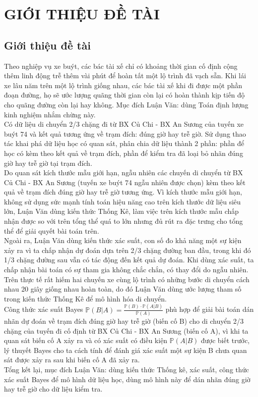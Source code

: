 \documentclass[a4paper, 13pt]{report}
\begin{document}
\chapter{GIỚI THIỆU ĐỀ TÀI} %
\section{Giới thiệu đề tài}
Theo nghiệp vụ xe buýt, các bác tài xế chỉ có khoảng thời gian cố định cộng thêm linh động trễ thêm vài phút để hoàn tất một lộ trình đã vạch sẵn. Khi lái xe lâu năm trên một lộ trình giống nhau, các bác tài xế khi đi được một phần đoạn đường, họ sẽ ước lượng quãng thời gian còn lại có hoàn thành kịp tiến độ cho quãng đường còn lại hay không. Mục đích Luận Văn: dùng Toán định lượng kinh nghiệm nhắm chừng này.\\
Có dữ liệu di chuyển 2/3 chặng đi từ BX Củ Chi - BX An Sương của tuyến xe buýt 74 và kết quả tương ứng về trạm đích: đúng giờ hay trễ giờ. Sử dụng thao tác khai phá dữ liệu học có quan sát, phân chia dữ liệu thành 2 phần: phần để học có kèm theo kết quả về trạm đích, phần để kiểm tra đã loại bỏ nhãn đúng giờ hay trễ giờ tại trạm đích.\\
Do quan sát kích thước mẫu giới hạn, ngẫu nhiên các chuyến di chuyển từ BX Củ Chi - BX An Sương (tuyến xe buýt 74 ngẫu nhiên được chọn) kèm theo kết quả về trạm đích đúng giờ hay trễ giờ tương ứng. Vì kích thước mẫu giới hạn, không sử dụng sức mạnh tính toán hiệu năng cao trên kích thước dữ liệu siêu lớn, Luận Văn dùng kiến thức Thống Kê, làm việc trên kích thước mẫu chấp nhận được so với trên tổng thể quá to lớn nhưng  đủ rút ra đặc trưng cho tổng thể để giải quyết bài toán trên.\\
Ngoài ra, Luận Văn dùng kiến thức xác suất, con số đo khả năng một sự kiện xảy ra vì ta chấp nhận dự đoán dựa trên 2/3 chặng đường ban đầu, trong khi đó 1/3 chặng đường sau vẫn có tác động đến kết quả dự đoán. Khi dùng xác suất, ta chấp nhận bài toán có sự tham gia không chắc chắn, có thay đổi do ngẫu nhiên.\\
Trên thực tế rất hiếm hai chuyến xe cùng lộ trình có những bước di chuyển cách nhau 20 giây giống nhau hoàn toàn, do đó Luận Văn dùng ước lượng tham số trong kiến thức Thống Kê để mô hình hóa di chuyển.\\  
Công thức xác suất Bayes $\mathbb{P}(B|A) = \frac{\mathbb{P}(B) \cdot \mathbb{P}(A|B)}{\mathbb{P}(A)}$ phù hợp để giải bài toán dán nhãn dự đoán về trạm đích đúng giờ hay trễ giờ (biến cố B) cho di chuyển 2/3 chặng của tuyến đi cố định từ BX Củ Chi - BX An Sương (biến cố A), vì khi ta quan sát biến cố A xảy ra và có xác suất có điều kiện $\mathbb{P}(A|B)$ được biết trước, lý thuyết Bayes cho ta cách tính để đánh giá xác suất một sự kiện B chưa quan sát được xảy ra sau khi biến cố A đã xảy ra.\\
Tổng kết lại, mục đích Luận Văn: dùng kiến thức Thống kê, xác suất, công thức xác suất Bayes để mô hình dữ liệu học, dùng mô hình này để dán nhãn đúng giờ hay trễ giờ cho dữ liệu kiểm tra.\\
\end{document}
